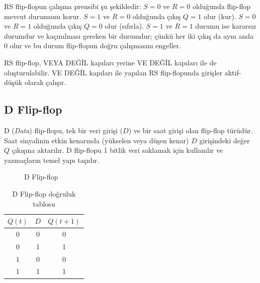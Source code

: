 RS flip-flopun çalışma prensibi şu şekildedir: $S = 0$ ve $R = 0$ olduğunda flip-flop mevcut durumunu korur. $S = 1$ ve $R = 0$ olduğunda çıkış $Q = 1$ olur (kur). $S = 0$ ve $R = 1$ olduğunda çıkış $Q = 0$ olur (sıfırla). $S = 1$ ve $R = 1$ durumu ise kararsız durumdur ve kaçınılması gereken bir durumdur; çünkü her iki çıkış da aynı anda 0 olur ve bu durum flip-flopun doğru çalışmasını engeller.

RS flip-flop, VEYA DEĞİL kapıları yerine VE DEĞİL kapıları ile de oluşturulabilir. VE DEĞİL kapıları ile yapılan RS flip-flopunda girişler aktif-düşük olarak çalışır.


\subsection{D Flip-flop}

D (\emph{Data}) flip-flopu, tek bir veri girişi ($D$) ve bir saat girişi olan flip-flop türüdür. Saat sinyalinin etkin kenarında (yükselen veya düşen kenar) $D$ girişindeki değer $Q$ çıkışına aktarılır. D flip-flopu 1 bitlik veri saklamak için kullanılır ve yazmaçların temel yapı taşıdır.

\begin{figure}[H]
\centering
{}
\caption{D Flip-flop}
\label{fig:B.25}
\end{figure}

\begin{table}[H]
\centering
\caption{D Flip-flop doğruluk tablosu}
\label{tab:B.13}
\begin{tabular}{cc|c}
\toprule
$Q(t)$ & $D$ & $Q(t+1)$ \\
\midrule
0 & 0 & 0 \\
0 & 1 & 1 \\
1 & 0 & 0 \\
1 & 1 & 1 \\
\bottomrule
\end{tabular}
\end{table}


